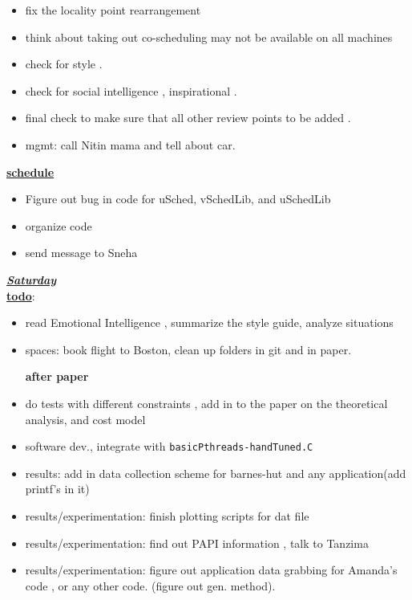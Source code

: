 \begin{itemize}
\item  fix the locality point rearrangement
\item think about taking out co-scheduling may not be available on all machines

\item check for style .
\item check for social intelligence , inspirational .

\item final check to make sure that all other review points to be added .

\item mgmt: call Nitin mama and tell about car.

\end{itemize}

\underline{\textbf{schedule}}\\
\begin{itemize}
\item Figure out bug in code  for uSched, vSchedLib, and uSchedLib
\item organize code 
\item send message to Sneha 
\end{itemize}

\underline{\textbf{\textit{Saturday}}}\\
\underline{\textbf{todo}}:
\begin{itemize}
\item read Emotional Intelligence  , summarize the style guide, analyze situations
\item spaces: book flight to Boston, clean up folders in git and in paper.

\textbf{after paper}

\item do tests with different constraints ,  add in to the paper on the theoretical analysis, and cost model
\item software dev., integrate with \texttt{basicPthreads-handTuned.C}
\item results: add in data collection scheme for barnes-hut and any application(add printf's in it)
\item results/experimentation: finish plotting scripts for dat file
\item results/experimentation: find out PAPI information , talk to Tanzima
\item results/experimentation: figure out application data grabbing for Amanda's code , or any other code.  (figure out gen. method).
\end{itemize}

